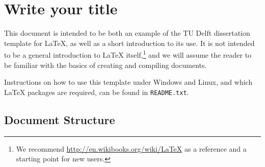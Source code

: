 \chapter{Write your title} %
\label{chapter_x} %
\graphicspath{ {./chapter-xxx/figures/} }  %
\captionsetup[figure]{labelfont=bf}
\captionsetup{margin=1.5em}
\captionsetup[table]{labelfont=bf}






\noindent This document is intended to be both an example of the TU Delft dissertation template for \LaTeX, as well as a short introduction to its use. It is not intended to be a general introduction to \LaTeX{} itself,\footnote{We recommend \url{http://en.wikibooks.org/wiki/LaTeX} as a reference and a starting point for new users.} and we will assume the reader to be familiar with the basics of creating and compiling documents.

Instructions on how to use this template under Windows and Linux, and which \LaTeX{} packages are required, can be found in \texttt{README.txt}.

\section{Document Structure}

